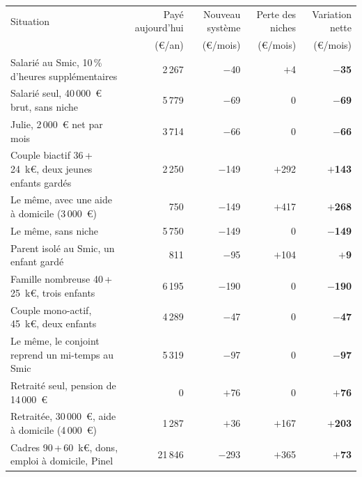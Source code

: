 \begin{tabular}{lrrrr}\hline
Situation & Payé aujourd'hui & Nouveau système & Perte des niches & Variation nette \\
 & (€/an) & (€/mois) & (€/mois) & (€/mois) \\ \hline
Salarié au Smic, 10\,\% d'heures supplémentaires & 2\,267 & $-$40 & $+$4 & \textbf{$-$35} \\
Salarié seul, 40\,000~€ brut, sans niche & 5\,779 & $-$69 & 0 & \textbf{$-$69} \\
Julie, 2\,000~€ net par mois & 3\,714 & $-$66 & 0 & \textbf{$-$66} \\
Couple biactif 36\,+\,24~k€, deux jeunes enfants gardés & 2\,250 & $-$149 & $+$292 & \textbf{$+$143} \\
Le même, avec une aide à domicile (3\,000~€) & 750 & $-$149 & $+$417 & \textbf{$+$268} \\
Le même, sans niche & 5\,750 & $-$149 & 0 & \textbf{$-$149} \\
Parent isolé au Smic, un enfant gardé & 811 & $-$95 & $+$104 & \textbf{$+$9} \\
Famille nombreuse 40\,+\,25~k€, trois enfants & 6\,195 & $-$190 & 0 & \textbf{$-$190} \\
Couple mono-actif, 45~k€, deux enfants & 4\,289 & $-$47 & 0 & \textbf{$-$47} \\
Le même, le conjoint reprend un mi-temps au Smic & 5\,319 & $-$97 & 0 & \textbf{$-$97} \\
Retraité seul, pension de 14\,000~€ & 0 & $+$76 & 0 & \textbf{$+$76} \\
Retraitée, 30\,000~€, aide à domicile (4\,000~€) & 1\,287 & $+$36 & $+$167 & \textbf{$+$203} \\
Cadres 90\,+\,60~k€, dons, emploi à domicile, Pinel & 21\,846 & $-$293 & $+$365 & \textbf{$+$73} \\
\hline\end{tabular}

